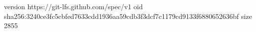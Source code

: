 version https://git-lfs.github.com/spec/v1
oid sha256:3240ce3fc5cbfed7633cdd1936aa59cdb3f3dcf7c1179cd9133f6880652636bf
size 2855
